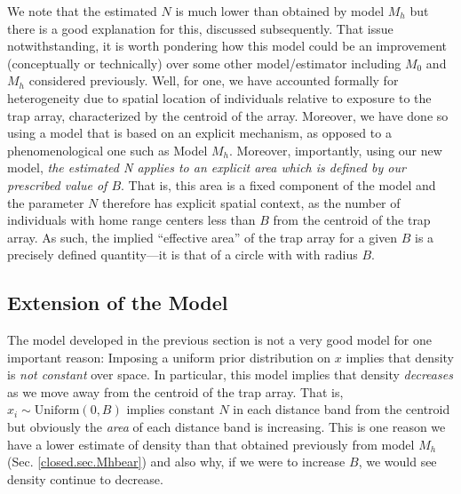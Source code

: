 We note that the estimated $N$ is much lower than obtained by model
$M_h$ but there is a good explanation for this, discussed
subsequently. That issue notwithstanding, it is worth pondering how
this model could be an improvement (conceptually or technically) over
some other model/estimator including $M_0$ and $M_h$ considered
previously. Well, for one, we have accounted formally for
heterogeneity due to spatial location of individuals relative to
exposure to the trap array, characterized by the centroid of the
array. Moreover, we have done so using a model that is based on an
explicit mechanism, as opposed to a phenomenological one such as Model
$M_h$. Moreover, importantly, using our new model, {\it the estimated
  N applies to an explicit area which is defined by our prescribed
  value of $B$}. That is, this area is a fixed component of the model
and the parameter $N$ therefore has explicit spatial context, as the
number of individuals with home range centers less than $B$ from the
centroid of the trap array. As such, the implied ``effective area'' of
the trap array for a given $B$ is a precisely defined quantity---it is
that of a circle with with radius $B$.


\subsection{Extension of the Model}

The model developed in the previous section is not a very good model
for one important reason: Imposing a uniform prior distribution on $x$
implies that density is {\it not constant} over space. In particular,
this model implies that density {\it decreases} as we move away from the
centroid of the trap array.  That is, $x_{i} \sim \mbox{Uniform}(0,B)$
implies constant $N$ in each distance band from the centroid but
obviously the {\it area} of each distance band is increasing.  This is
one reason we have a lower estimate of density than that obtained
previously from model $M_h$ (Sec. \ref{closed.sec.Mhbear}) and also
why, if we were to increase $B$, we would see density continue to
decrease.


